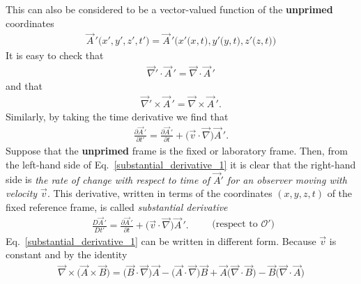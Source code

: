 \documentclass[11pt,a4paper,oneside]{book}
\numberwithin{equation}{section}
\theoremstyle{it}
\theoremstyle{definition}
\begin{document}
This can also be considered to be a vector-valued function of the 
\textbf{unprimed} coordinates
\begin{equation*}
	\begin{aligned}
		\vec{A}\,'\big(x',y',z',t'\big) = 	
		\vec{A}\,'\big(x'\big(x,t\big),y'\big(y,t\big),z'\big(z,t\big)\big)
	\end{aligned}
\end{equation*} 
It is easy to check that
\begin{equation}\label{ident1}
	\begin{aligned}
		\vec{\nabla}'\cdot\vec{A}\,' = \vec{\nabla}\cdot\vec{A}\,'
	\end{aligned}
\end{equation} 
and that
\begin{equation}\label{ident2}
	\begin{aligned}
		\vec{\nabla}'\times\vec{A}\,' = \vec{\nabla}\times\vec{A}\,'.
	\end{aligned}
\end{equation} 
Similarly, by taking the time derivative we find that
\begin{equation}\label{substantial_derivative_1}
	\begin{aligned}
		\frac{\partial \vec{A}\,'}{\partial t'} = \frac{\partial 
		\vec{A}\,'}{\partial t} + \big(\vec{v}\cdot\vec{\nabla}\big)\vec{A}\,'.
	\end{aligned}
\end{equation} 
Suppose that the \textbf{unprimed} frame is the fixed or laboratory frame. 
Then, from the left-hand side of Eq.~\ref{substantial_derivative_1} it is clear 
that the right-hand side is \textit{the rate of change with respect to time of 
$\vec{A}'$ for an observer moving with velocity $\vec{v}$}. This derivative, 
written in terms of the coordinates $(x,y,z,t)$ of the fixed reference frame, 
is called \textit{substantial derivative}
\begin{equation}\label{substantial_derivative_2}
	\boxed{	\begin{aligned}
			\frac{D \vec{A}\,'}{D t'} = \frac{\partial \vec{A}\,'}{\partial t} 
			+ \big(\vec{v}\cdot\vec{\nabla}\big)\vec{A}\,'.
	\end{aligned}}\qquad\text{(respect to $\mathcal{O'}$)}
\end{equation} 
Eq.~\ref{substantial_derivative_1} can be written in different form. Because 
$\vec{v}$ is constant and by the identity
\begin{equation}\label{}
	\begin{aligned}
		\vec{\nabla}\times\big(\vec{A}\times\vec{B}\big)=\big(\vec{B}\cdot 
		\vec{\nabla}\big)\vec{A}-\big(\vec{A}\cdot\vec{\nabla}\big)\vec{B}+
		\vec{A}\big(\vec{\nabla}\cdot\vec{B}\big)- 
		\vec{B}\big(\vec{\nabla}\cdot\vec{A}\big)
	\end{aligned}
\end{equation} 
\end{document}
